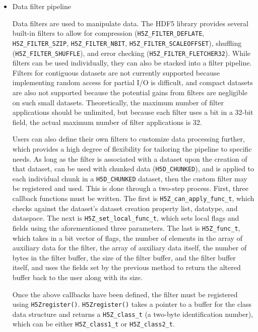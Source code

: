 \begin{itemize}
    \item Data filter pipeline

Data filters are used to manipulate data. The HDF5 library provides several built-in filters to allow for compression ({\footnotesize\texttt{H5Z\_FILTER\_DEFLATE}, \texttt{H5Z\_FILTER\_SZIP}, \texttt{H5Z\_FILTER\_NBIT}, \texttt{H5Z\_FILTER\_SCALEOFFSET}}), shuffling ({\footnotesize\texttt{H5Z\_FILTER\_SHUFFLE}}), and error checking ({\footnotesize\texttt{H5Z\_FILTER\_FLETCHER32}}). While filters can be used individually, they can also be stacked into a filter pipeline. Filters for contiguous datasets are not currently supported because implementing random access for partial I/O is difficult, and compact datasets are also not supported because the potential gains from filters are negligible on such small datasets. Theoretically, the maximum number of filter applications should be unlimited, but because each filter uses a bit in a 32-bit field, the actual maximum number of filter applications is 32. 

Users can also define their own filters to customize data processing further, which provides a high degree of flexibility for tailoring the pipeline to specific needs. As long as the filter is associated with a dataset upon the creation of that dataset, can be used with chunked data (\texttt{H5D\_CHUNKED}), and is applied to each individual chunk in a \texttt{H5D\_CHUNKED} dataset, then the custom filter may be registered and used. This is done through a two-step process. First, three callback functions must be written. The first is \texttt{H5Z\_can\_apply\_func\_t}, which checks against the dataset's dataset creation property list, datatype, and dataspace. The next is \texttt{H5Z\_set\_local\_func\_t}, which sets local flags and fields using the aforementioned three parameters. The last is \texttt{H5Z\_func\_t}, which takes in a bit vector of flags, the number of elements in the array of auxiliary data for the filter, the array of auxiliary data itself, the number of bytes in the filter buffer, the size of the filter buffer, and the filter buffer itself, and uses the fields set by the previous method to return the altered buffer back to the user along with its size. 

Once the above callbacks have been defined, the filter must be registered using \texttt{H5Zregister()}. \texttt{H5Zregister()} takes a pointer to a buffer for the class data structure and returns a \texttt{H5Z\_class\_t} (a two-byte identification number), which can be either \texttt{H5Z\_class1\_t} or \texttt{H5Z\_class2\_t}. 


\end{itemize}

